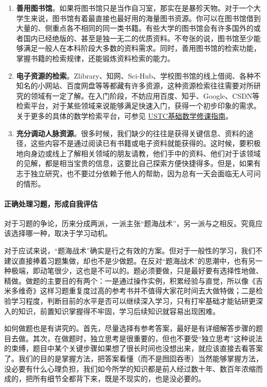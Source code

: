 \begin{enumerate}
	\item \textbf{善用图书馆}。如果将图书馆只是当作自习室，那实在是暴殄天物。对于一个大学生来说，图书馆有着最直接也最好用的海量图书资源。你可以在图书馆借到大量的、侧重点各不相同的同一类书籍。有些大学的图书馆会有许多国外的或者国内已经绝版的、甚至是独一无二的优质资料。不夸张的说，图书馆至少能够满足一般人在本科阶段大多数的资料需求。同时，善用图书馆的检索功能，掌握书籍的检索规律，还能锻炼资料检索的能力。
	\item \textbf{电子资源的检索}。Zlibrary、知网、Sci-Hub、学校图书馆的线上借阅、各种不知名的小网站、百度网盘等等都藏有许多资源，这种资源检索往往需要对所研究的领域有一定了解。在入门阶段，不妨应用百度、知乎、Google、CSDN等检索平台，对于某些领域来说能够满足快速入门，获得一个初步印象的需求。
	      关于更多的具体的数学检索平台，可参见 \href{http://home.ustc.edu.cn/~yx3x/USTC/ustcmathplan3.pdf}{USTC基础数学修课指南}。
	\item \textbf{充分调动人脉资源}。很多时候，我们缺少的往往是获得关键信息、资料的途径，这些内容不是通过阅读已有书籍或电子资料就能获得的。这时候，要积极地向身边或线上了解相关领域的朋友请教，他们手中的资料、他们对于该领域的见解，都是相当宝贵的信息，这要比自己探索方便快捷得多。但是，如果有志于独立研究，也不要过分依赖于他人的帮助，因为总有一天会面临无人可问的情形。
\end{enumerate}

\paragraph{正确处理习题，形成自我评估}

对于习题的争论，历来分成两派，一派主张“题海战术”，另一派与之相反。究竟应该选择哪一种，取决于学习动机。

对于应试来说，“题海战术”确实是行之有效的方案。但对于一般性的学习，我们不建议直接捧着习题集做，却也不是少做题。在反对“题海战术”的思潮中，也有另一种极端，即动笔很少，这也是不可以的。题必须要做，只是最好要有选择性地做、精做。做题的主要目的有两个：一是通过操作实例，积累经验与直觉，所以像《吉米多维奇》这样习题重复度过高的参考书并不值得大家花时间去大做特做；二是检验学习程度，判断目前的水平是否可以继续深入学习，只有打牢基础才能钻研更深入的知识，前置知识掌握得不牢固，学习后续知识就容易出现困难。

如何做题也是有讲究的。首先，尽量选择有参考答案，最好是有详细解答步骤的题目去做。其次，在做题时，独立思考是很重要的，但也不要受“独立思考”这种说法的束缚，题目中某个关键步骤如果想了很长时间也没想出来，就应该直接去看答案了。我们的目的是掌握方法，把答案看懂（而不是囫囵吞枣）当然能够掌握方法，没必要有什么心理负担，我们如今所学的知识都是前人经过数十年、数百年浓缩而成的，把所有细节全都背下来，既是不现实的，也是没必要的。

